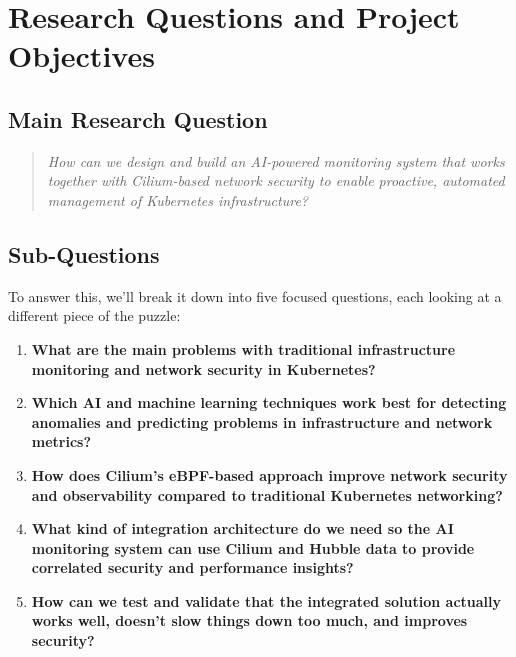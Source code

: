 \chapter{Research Questions and Project Objectives}
\label{chapter:research-questions}

\section{Main Research Question}

\begin{quote}
\textit{How can we design and build an AI-powered monitoring system that works together with Cilium-based network security to enable proactive, automated management of Kubernetes infrastructure?}
\end{quote}

\section{Sub-Questions}

To answer this, we'll break it down into five focused questions, each looking at a different piece of the puzzle:

\begin{enumerate}

    \item \textbf{What are the main problems with traditional infrastructure monitoring and network security in Kubernetes?}

    \item \textbf{Which AI and machine learning techniques work best for detecting anomalies and predicting problems in infrastructure and network metrics?}

    \item \textbf{How does Cilium's eBPF-based approach improve network security and observability compared to traditional Kubernetes networking?}

    \item \textbf{What kind of integration architecture do we need so the AI monitoring system can use Cilium and Hubble data to provide correlated security and performance insights?}

    \item \textbf{How can we test and validate that the integrated solution actually works well, doesn't slow things down too much, and improves security?}

\end{enumerate}

